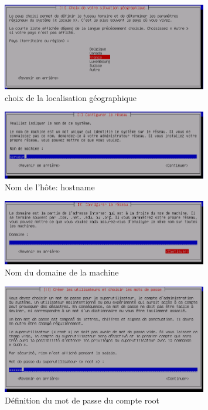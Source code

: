 \documentclass[11pt,a4paper,titlepage, oneside]{article}
\begin{document}
		\begin{figure}[htp]
                        \centering
                        \includegraphics[width=0.8\textwidth,natwidth=610,natheight=642]{images/debian3.png}
                        \caption{choix de la localisation géographique}
		\end{figure}
	
		\begin{figure}[htp]
                        \centering
                        \includegraphics[width=0.8\textwidth,natwidth=610,natheight=642]{images/debian4.png}
                        \caption{Nom de l'hôte: hostname}
		\end{figure}
	 
		\begin{figure}[htp]
                        \centering
                        \includegraphics[width=0.8\textwidth,natwidth=610,natheight=642]{images/debian5.png}
                        \caption{Nom du domaine de la machine}
		\end{figure}
	 
		\begin{figure}[htp]
                        \centering
                        \includegraphics[width=0.8\textwidth,natwidth=610,natheight=642]{images/debian6.png}
                        \caption{Définition du mot de passe du compte root}
		\end{figure}
	 
\end{document}
